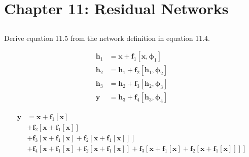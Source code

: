 \documentclass[12pt]{report}
\begin{document}
\section*{Chapter 11: Residual Networks}

\subsection{}
\begin{mdframed}
    Derive equation 11.5 from the network definition in equation 11.4.

    \begin{align*}
        \mathbf{h}_{1} & = \mathbf{x} + \mathbf{f}_{1}[\mathbf{x}, \boldsymbol{\phi}_{1}]         \\
        \mathbf{h}_{2} & = \mathbf{h}_{1} + \mathbf{f}_{2}[\mathbf{h}_{1}, \boldsymbol{\phi}_{2}] \\
        \mathbf{h}_{3} & = \mathbf{h}_{2} + \mathbf{f}_{3}[\mathbf{h}_{2}, \boldsymbol{\phi}_{3}] \\
        \mathbf{y}     & = \mathbf{h}_{3} + \mathbf{f}_{4}[\mathbf{h}_{3}, \boldsymbol{\phi}_{4}]
        \label{eq:11.4}
        \tag{11.4}
    \end{align*}

    \begin{align*}
        \mathbf{y} & = \mathbf{x} + \mathbf{f}_{1}[\mathbf{x}]                                                                                                                                                                                               \\
                   & + \mathbf{f}_{2}[\mathbf{x} + \mathbf{f}_{1}[\mathbf{x}]]                                                                                                                                                                               \\
                   & + \mathbf{f}_{3}[\mathbf{x} + \mathbf{f}_{1}[\mathbf{x}] + \mathbf{f}_{2}[\mathbf{x} + \mathbf{f}_{1}[\mathbf{x}]]]                                                                                                                     \\
                   & + \mathbf{f}_{4}[\mathbf{x} + \mathbf{f}_{1}[\mathbf{x}] + \mathbf{f}_{2}[\mathbf{x} + \mathbf{f}_{1}[\mathbf{x}]] + \mathbf{f}_{3}[\mathbf{x} + \mathbf{f}_{1}[\mathbf{x}] + \mathbf{f}_{2}[\mathbf{x} + \mathbf{f}_{1}[\mathbf{x}]]]]
        \label{eq:11.5}
        \tag{11.5}
    \end{align*}
\end{mdframed}
\end{document}
